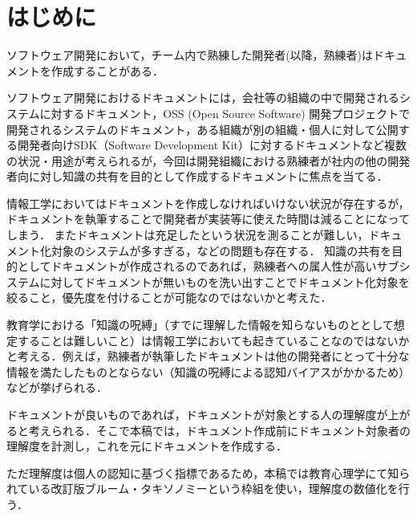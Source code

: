 \section{はじめに}
ソフトウェア開発において，チーム内で熟練した開発者(以降，熟練者)はドキュメントを作成することがある．\cite{bib:ozawa}

ソフトウェア開発におけるドキュメントには，会社等の組織の中で開発されるシステムに対するドキュメント，OSS (Open Source Software) 開発プロジェクトで開発されるシステムのドキュメント，ある組織が別の組織・個人に対して公開する開発者向けSDK（Software Development Kit）に対するドキュメントなど複数の状況・用途が考えられるが，今回は開発組織における熟練者が社内の他の開発者向に対し知識の共有を目的として作成するドキュメントに焦点を当てる．

情報工学においてはドキュメントを作成しなければいけない状況が存在するが，ドキュメントを執筆することで開発者が実装等に使えた時間は減ることになってしまう．
またドキュメントは充足したという状況を測ることが難しい，ドキュメント化対象のシステムが多すぎる，などの問題も存在する．
知識の共有を目的としてドキュメントが作成されるのであれば，熟練者への属人性が高いサブシステムに対してドキュメントが無いものを洗い出すことでドキュメント化対象を絞ること，優先度を付けることが可能なのではないかと考えた．

教育学における「知識の呪縛」（すでに理解した情報を知らないものととして想定することは難しいこと）\cite{bib:kaneda}は情報工学においても起きていることなのではないかと考える．例えば，熟練者が執筆したドキュメントは他の開発者にとって十分な情報を満たしたものとならない（知識の呪縛による認知バイアスがかかるため）などが挙げられる．

ドキュメントが良いものであれば，ドキュメントが対象とする人の理解度が上がると考えられる．そこで本稿では，ドキュメント作成前にドキュメント対象者の理解度を計測し，これを元にドキュメントを作成する．

ただ理解度は個人の認知に基づく指標であるため，本稿では教育心理学にて知られている改訂版ブルーム・タキソノミーという枠組を使い，理解度の数値化を行う．
